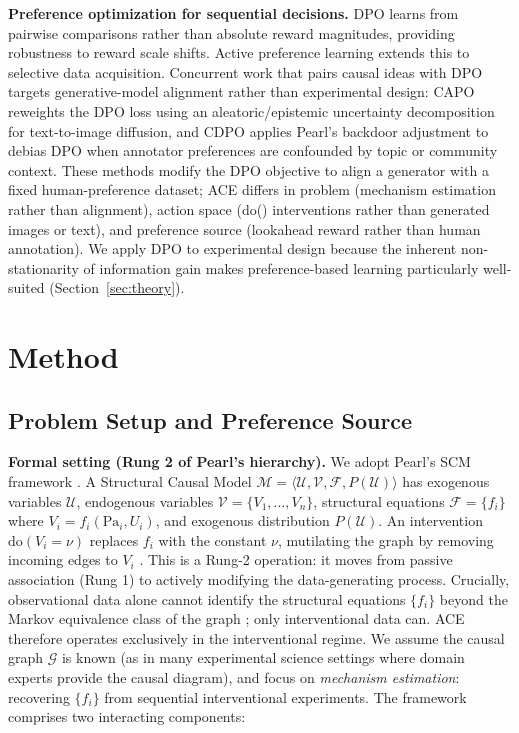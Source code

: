 \documentclass{article}
\theoremstyle{plain}
\theoremstyle{definition}
\theoremstyle{remark}
\begin{document}
\textbf{Preference optimization for sequential decisions.} DPO \citep{rafailov2023direct} learns from pairwise comparisons rather than absolute reward magnitudes, providing robustness to reward scale shifts. Active preference learning \citep{activedpo2024} extends this to selective data acquisition. Concurrent work that pairs causal ideas with DPO targets generative-model alignment rather than experimental design: CAPO \citep{hu2026capo} reweights the DPO loss using an aleatoric/epistemic uncertainty decomposition for text-to-image diffusion, and CDPO \citep{le2026cdpo} applies Pearl's backdoor adjustment to debias DPO when annotator preferences are confounded by topic or community context. These methods modify the DPO objective to align a generator with a fixed human-preference dataset; ACE differs in problem (mechanism estimation rather than alignment), action space (do() interventions rather than generated images or text), and preference source (lookahead reward rather than human annotation). We apply DPO to experimental design because the inherent non-stationarity of information gain makes preference-based learning particularly well-suited (Section~\ref{sec:theory}).

\section{Method}
\label{sec:methods}

\subsection{Problem Setup and Preference Source}
\label{sec:problem}

\textbf{Formal setting (Rung 2 of Pearl's hierarchy).} We adopt Pearl's SCM framework \citep{pearl2009causality,pearl1995causal}. A Structural Causal Model $\mathcal{M} = \langle \mathcal{U}, \mathcal{V}, \mathcal{F}, P(\mathcal{U}) \rangle$ has exogenous variables $\mathcal{U}$, endogenous variables $\mathcal{V} = \{V_1, \ldots, V_n\}$, structural equations $\mathcal{F} = \{f_i\}$ where $V_i = f_i(\text{Pa}_i, U_i)$, and exogenous distribution $P(\mathcal{U})$. An intervention $\text{do}(V_i = \nu)$ replaces $f_i$ with the constant $\nu$, mutilating the graph by removing incoming edges to $V_i$ \citep{pearl2009causality}. This is a Rung-2 operation: it moves from passive association (Rung 1) to actively modifying the data-generating process. Crucially, observational data alone cannot identify the structural equations $\{f_i\}$ beyond the Markov equivalence class of the graph \citep{spirtes2000causation,peters2017elements}; only interventional data can. ACE therefore operates exclusively in the interventional regime. We assume the causal graph $\mathcal{G}$ is known (as in many experimental science settings where domain experts provide the causal diagram), and focus on \emph{mechanism estimation}: recovering $\{f_i\}$ from sequential interventional experiments. The framework comprises two interacting components:
\end{document}
